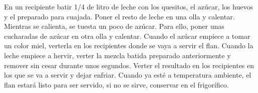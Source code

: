 En un recipiente batir 1/4 de litro de leche con los quesitos, el azúcar, los huevos y el preparado para cuajada.
Poner el resto de leche en una olla y calentar.
Mientras se calienta, se tuesta un poco de azúcar. Para ello, poner unas cucharadas de azúcar en otra olla y calentar. Cuando el azúcar empiece a tomar un color miel, verterla en los recipientes donde se vaya a servir el flan.
Cuando la leche empiece a hervir, verter la mezcla batida preparado anteriormente y remover sin cesar durante unos segundos.
Verter el resultado en los recipientes en los que se va a servir y dejar enfriar. Cuando ya esté a temperatura ambiente, el flan estará listo para ser servido, si no se sirve, conservar en el frigorífico.
